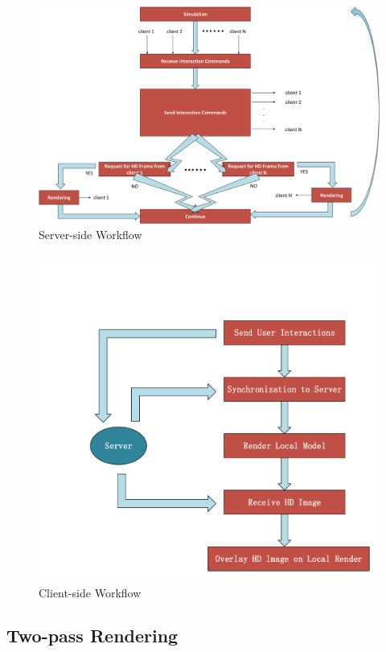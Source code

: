 \begin{figure}[!htbp]
	\includegraphics[width=\textwidth]{figures/workflow_server-eps-converted-to.pdf}
	\caption{Server-side Workflow}
	\label{fig:s-wf}
\end{figure}

\begin{figure}[!htbp]
	\includegraphics[width=\textwidth]{figures/workflow_client.pdf}
	\caption{Client-side Workflow}
	\label{fig:c-wf}
\end{figure}

\subsection{Two-pass Rendering}


